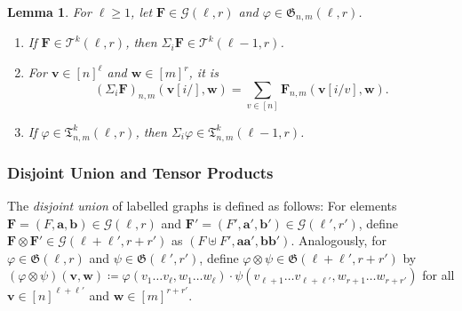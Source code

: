 \documentclass[10pt,a4paper]{article}
\theoremstyle{definition}
\theoremstyle{plain}
\newtheorem{lemma}[definition]{Lemma}
\theoremstyle{remark}
\renewcommand{\phi}{\varphi}
\begin{document}
	\begin{lemma}\label{lem:unlabelling}
		For $\ell \geq 1$,
		let $\boldsymbol{F} \in \mathcal{G}(\ell, r)$
		and $\phi \in \mathfrak{G}_{n,m}(\ell, r)$.
		\begin{enumerate}
			\item If $\boldsymbol{F} \in \mathcal{T}^k(\ell, r)$,
			then $\Sigma_i\boldsymbol{F} \in \mathcal{T}^k(\ell-1, r)$.
			\item For $\boldsymbol{v} \in [n]^\ell$ and $\boldsymbol{w} \in [m]^r$,  it is
					\[
			(\Sigma_i \boldsymbol{F})_{n,m}(\boldsymbol{v}[i/],\boldsymbol{w}) = \sum_{v \in [n]} \boldsymbol{F}_{n,m}(\boldsymbol{v}[i/v], \boldsymbol{w}).
			\]
			\item If $\phi \in \mathfrak{T}^k_{n,m}(\ell, r)$, then $\Sigma_i \phi \in \mathfrak{T}^k_{n,m}(\ell-1, r)$. 
		\end{enumerate}
	\end{lemma}

	\subsubsection{Disjoint Union and Tensor Products}

	The \emph{disjoint union} of labelled graphs is defined as follows:
	For elements $\boldsymbol{F} = (F, \boldsymbol{a}, \boldsymbol{b}) \in \mathcal{G}(\ell, r)$ and $\boldsymbol{F}' = (F', \boldsymbol{a}', \boldsymbol{b}') \in \mathcal{G}(\ell', r')$,
	define $\boldsymbol{F} \otimes \boldsymbol{F}' \in \mathcal{G}(\ell+\ell', r+r')$
	as $(F \uplus F', \boldsymbol{a}\boldsymbol{a}', \boldsymbol{b}\boldsymbol{b}')$.
	Analogously, for $\phi \in \mathfrak{G}(\ell ,r )$ and $\psi \in \mathfrak{G}(\ell', r')$,
	define $\phi \otimes \psi \in \mathfrak{G}(\ell+\ell', r+r')$ by $(\phi \otimes \psi)(\boldsymbol{v}, \boldsymbol{w}) \coloneqq \phi(v_1 \dots v_\ell, w_1 \dots w_\ell) \cdot \psi(v_{\ell+1} \dots v_{\ell+\ell'}, w_{r+1} \dots w_{r+r'})$ for all $\boldsymbol{v} \in [n]^{\ell+\ell'}$ and $\boldsymbol{w} \in [m]^{r+r'}$.
	
\end{document}
